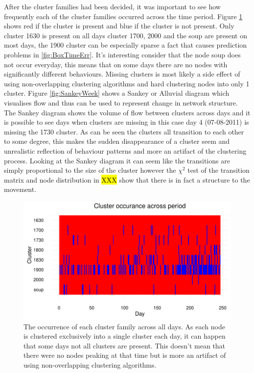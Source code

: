 After the cluster families had been decided, it was important to see how frequently each of the cluster families occurred across the time period. Figure \ref{fig:Clusterocurrance} shows red if the cluster is present and blue if the cluster is not present. Only cluster 1630 is present on all days cluster 1700, 2000 and the soup are present on most days, the 1900 cluster can be especially sparse a fact that causes prediction problems in \ref{fig:BoxTimeErr}. It's interesting consider that the node soup does not occur everyday, this means that on some days there are no nodes with significantly different behaviours. Missing clusters is most likely a side effect of using non-overlapping clustering algorithms and hard clustering nodes into only 1 cluster. 
Figure \ref{fig:SankeyWeek} shows a Sankey or Alluvial diagram \cite{sankeydiagrams} \cite{rosvall2010} which visualises flow and thus can be used to represent change in network structure. The Sankey diagram shows the volume of flow between clusters across days and it is possible to see days when clusters are missing in this case day 4 (07-08-2011) is missing the 1730 cluster. As can be seen the clusters all transition to each other to some degree, this makes the sudden disappearance of a cluster seem and unrealistic reflection of behaviour patterns and more an artifact of the clustering process. Looking at the Sankey diagram it can seem like the transitions are simply proportional to the size of the cluster however the $\chi ^2$ test of the transition matrix and node distribution in \hl{XXX} show that there is in fact a structure to the movement.

\begin{figure}
    \centering
    \includegraphics[width=\textwidth]{Figures/Results/Clusterocurrance}
    \caption[Cluster Occurance]{The occurrence of each cluster family across all days. As each node is clustered exclusively into a single cluster each day, it can happen that some days not all clusters are present. This doesn't mean that there were no nodes peaking at that time but is more an artifact of using non-overlapping clustering algorithms.}
    \label{fig:Clusterocurrance}
\end{figure}


